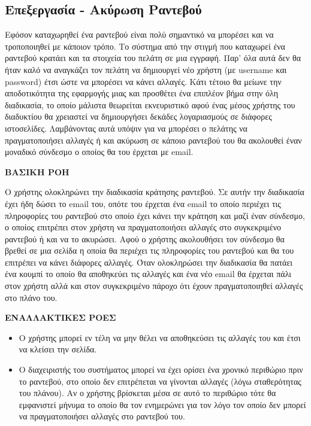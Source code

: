 \subsection{Επεξεργασία - Ακύρωση Ραντεβού}
Εφόσον καταχωρηθεί ένα ραντεβού είναι πολύ σημαντικό να μπορέσει και να τροποποιηθεί με κάποιον τρόπο. Το σύστημα από την στιγμή που καταχωρεί ένα ραντεβού κρατάει και τα στοιχεία του πελάτη σε μια εγγραφή. Παρ' όλα αυτά δεν θα ήταν καλό να αναγκάζει τον πελάτη να δημιουργεί νέο χρήστη (με username και password) έτσι ώστε να μπορέσει να κάνει αλλαγές. Κάτι τέτοιο θα μείωνε την αποδοτικότητα της εφαρμογής μιας και προσθέτει ένα επιπλέον βήμα στην όλη διαδικασία, το οποίο μάλιστα θεωρείται εκνευριστικό αφού ένας μέσος χρήστης του διαδυκτίου θα χρειαστεί να δημιουργήσει δεκάδες λογαριασμούς σε διάφορες ιστοσελίδες. Λαμβάνοντας αυτά υπόψιν για να μπορέσει ο πελάτης να πραγματοποιήσει αλλαγές ή και ακύρωση σε κάποιο ραντεβού του θα ακολουθεί έναν μοναδικό σύνδεσμο ο οποίος θα του έρχεται με email.

\textbf{ΒΑΣΙΚΗ ΡΟΗ}

Ο χρήστης ολοκληρώνει την διαδικασία κράτησης ραντεβού. Σε αυτήν την διαδικασία έχει ήδη δώσει το email του, οπότε του έρχεται ένα email το οποίο περιέχει τις πληροφορίες του ραντεβού στο οποίο έχει κάνει την κράτηση και μαζί έναν σύνδεσμο, ο οποίος επιτρέπει στον χρήστη να πραγματοποιήσει αλλαγές στο συγκεκριμένο ραντεβού ή και να το ακυρώσει. Αφού ο χρήστης ακολουθήσει τον σύνδεσμο θα βρεθεί σε μια σελίδα η οποία θα περιέχει τις πληροφορίες του ραντεβού και θα του επιτρέπει να κάνει διάφορες αλλαγές. Όταν ολοκληρώσει την διαδικασία θα πατάει ένα κουμπί το οποίο θα αποθηκεύει τις αλλαγές και ένα νέο email θα έρχεται πάλι στον χρήστη αλλά και στον συγκεκριμένο πάροχο ότι έχουν πραγματοποιηθεί αλλαγές στο πλάνο του.

\textbf{ΕΝΑΛΛΑΚΤΙΚΕΣ ΡΟΕΣ}

\begin{itemize}
\item Ο χρήστης μπορεί εν τέλη να μην θέλει να αποθηκεύσει τις αλλαγές του και έτσι να κλείσει την σελίδα.
\item Ο διαχειριστής του συστήματος μπορεί να έχει ορίσει ένα χρονικό περιθώριο πριν το ραντεβού, στο οποίο δεν επιτρέπεται να γίνονται αλλαγές (λόγω σταθερότητας του πλάνου). Αν ο χρήστης βρίσκεται μέσα σε αυτό το περιθώριο τότε θα εμφανιστεί μήνυμα το οποίο θα τον ενημερώνει για τον λόγο τον οποίο δεν μπορεί να πραγματοποιήσει αλλαγές στο ραντεβού του. 
\end{itemize}

